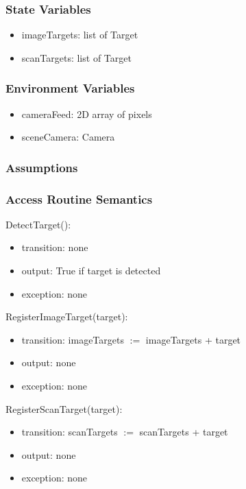\documentclass[12pt, titlepage]{article}
\begin{document}
\subsubsection{State Variables}
\begin{itemize}
\item imageTargets: list of Target
\item scanTargets: list of Target
\end{itemize}

\subsubsection{Environment Variables}

\begin{itemize}
\item cameraFeed: 2D array of pixels
\item sceneCamera: Camera
\end{itemize}


\subsubsection{Assumptions}

\subsubsection{Access Routine Semantics}

\noindent DetectTarget():
\begin{itemize}
\item transition: none
\item output: True if target is detected
\item exception: none
\end{itemize}

\noindent RegisterImageTarget(target):
\begin{itemize}
\item transition: imageTargets $:=$ imageTargets + target
\item output: none
\item exception: none
\end{itemize}

\noindent RegisterScanTarget(target):
\begin{itemize}
\item transition: scanTargets $:=$ scanTargets + target
\item output: none
\item exception: none
\end{itemize}
\end{document}
